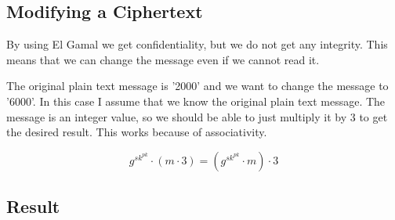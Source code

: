 \documentclass{article}
\begin{document}
\subsection{Modifying a Ciphertext}
By using El Gamal we get confidentiality, but we do not get any integrity.
This means that we can change the message even if we cannot read it.

The original plain text message is '2000' and we want to change the message to '6000'.
In this case I assume that we know the original plain text message.
The message is an integer value, so we should be able to just multiply it by 3 to get the desired result.
This works because of associativity.

\[g^{sk^{pk}} \cdot (m \cdot 3) = (g^{sk^{pk}} \cdot m) \cdot 3\]


\subsection{Result}
\label{subsec:result3}

\inputminted[linenos,firstline=53,lastline=62]{Python}{mandatory_exercise_1.py}
\end{document}
